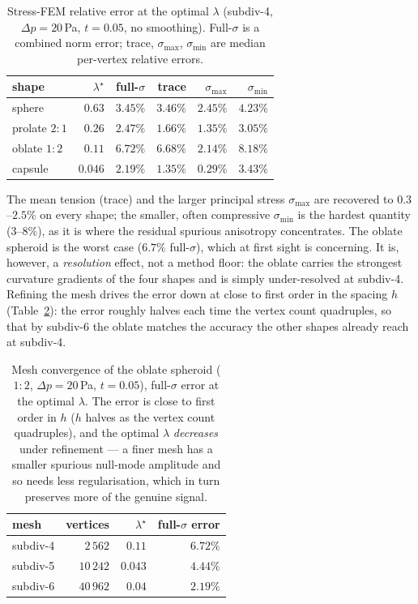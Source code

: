 \documentclass[11pt]{article}
\begin{document}
\begin{table}[ht]\centering
\caption{Stress-FEM relative error at the optimal $\lambda$ (subdiv-4, $\Delta p=20$\,Pa,
$t=0.05$, no smoothing).  Full-$\sigma$ is a combined norm error; trace,
$\sigma_{\max}$, $\sigma_{\min}$ are median per-vertex relative errors.}
\label{tab:fem-accuracy}
\begin{tabular}{lrrrrr}
\toprule
shape & $\lambda^\star$ & full-$\sigma$ & trace & $\sigma_{\max}$ & $\sigma_{\min}$ \\
\midrule
sphere          & $0.63$  & $3.45\%$ & $3.46\%$ & $2.45\%$ & $4.23\%$ \\
prolate $2{:}1$ & $0.26$  & $2.47\%$ & $1.66\%$ & $1.35\%$ & $3.05\%$ \\
oblate $1{:}2$  & $0.11$  & $6.72\%$ & $6.68\%$ & $2.14\%$ & $8.18\%$ \\
capsule         & $0.046$ & $2.19\%$ & $1.35\%$ & $0.29\%$ & $3.43\%$ \\
\bottomrule
\end{tabular}
\end{table}

The mean tension (trace) and the larger principal stress $\sigma_{\max}$ are recovered
to $0.3$--$2.5\%$ on every shape; the smaller, often compressive $\sigma_{\min}$ is the
hardest quantity ($3$--$8\%$), as it is where the residual spurious anisotropy
concentrates.  The oblate spheroid is the worst case ($6.7\%$ full-$\sigma$), which at
first sight is concerning.  It is, however, a \emph{resolution} effect, not a method
floor: the oblate carries the strongest curvature gradients of the four shapes and is
simply under-resolved at subdiv-4.  Refining the mesh drives the error down at close to
first order in the spacing $h$ (Table~\ref{tab:fem-oblate}): the error roughly halves
each time the vertex count quadruples, so that by subdiv-6 the oblate matches the
accuracy the other shapes already reach at subdiv-4.

\begin{table}[ht]\centering
\caption{Mesh convergence of the oblate spheroid ($1{:}2$, $\Delta p=20$\,Pa, $t=0.05$),
full-$\sigma$ error at the optimal $\lambda$.  The error is close to first order in $h$
($h$ halves as the vertex count quadruples), and the optimal $\lambda$ \emph{decreases}
under refinement --- a finer mesh has a smaller spurious null-mode amplitude and so needs
less regularisation, which in turn preserves more of the genuine signal.}
\label{tab:fem-oblate}
\begin{tabular}{lrrr}
\toprule
mesh & vertices & $\lambda^\star$ & full-$\sigma$ error \\
\midrule
subdiv-4 & $2\,562$  & $0.11$  & $6.72\%$ \\
subdiv-5 & $10\,242$ & $0.043$ & $4.44\%$ \\
subdiv-6 & $40\,962$ & $0.04$  & $2.19\%$ \\
\bottomrule
\end{tabular}
\end{table}
\end{document}
